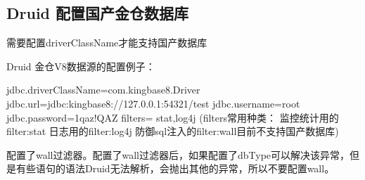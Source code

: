 \documentclass[a4,10pt,oneside,english]{sphinxmanual}
\begin{document}
\subsection{Druid 配置国产金仓数据库}
\label{\detokenize{interface/druid:id1}}
需要配置driverClassName才能支持国产数据库

Druid 金仓V8数据源的配置例子：

\begin{sphinxVerbatim}[commandchars=\\\{\}]
jdbc.driverClassName=com.kingbase8.Driver
jdbc.url=jdbc:kingbase8://127.0.0.1:54321/test
jdbc.username=root
jdbc.password=1qaz!QAZ
filters= stat,log4j
(filters常用种类：
监控统计用的filter:stat
日志用的filter:log4j
防御sql注入的filter:wall目前不支持国产数据库)
\end{sphinxVerbatim}

配置了wall过滤器。配置了wall过滤器后，如果配置了dbType可以解决该异常，但是有些语句的语法Druid无法解析，会抛出其他的异常，所以不要配置wall。
\end{document}
